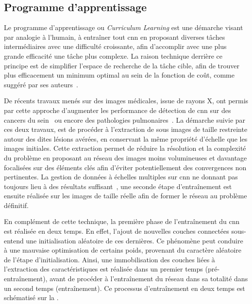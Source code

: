 \subsection{Programme d'apprentissage}
Le programme d'apprentissage ou \textit{Curriculum Learning} est une démarche visant par analogie à l'humain, à entraîner tout \gls{cnn} en proposant diverses tâches intermédiaires avec une difficulté croissante, afin d'accomplir avec une plus grande efficacité une tâche plus complexe. La raison technique derrière ce principe est de simplifier l'espace de recherche de la tâche cible, afin de trouver plus efficacement un minimum optimal au sein de la fonction de coût, comme suggéré par ses auteurs~\cite{Bengio2009}.\par

De récents travaux menés sur des images médicales, issue de rayons X, ont permis par cette approche d'augmenter les performance de détection de \gls{cnn} sur des cancers du sein~\cite{Lotter2017} ou encore des pathologies pulmonaires~\cite{Park2019}. La démarche suivie par ces deux travaux, est de procéder à l'extraction de sous images de taille restreinte autour des dites lésions avérées, en conservant la même propriété d'échelle que les images initiales. Cette extraction permet de réduire la résolution et la complexité du problème en proposant au réseau des images moins volumineuses et davantage focalisées sur des éléments clés afin d'éviter potentiellement des convergences non pertinentes. La gestion de données à échelles multiples sur \gls{cnn} ne donnant pas toujours lieu à des résultats suffisant~\cite{VanNoord2017}, une seconde étape d'entraînement est ensuite réalisée sur les images de taille réelle afin de former le réseau au problème définitif.\par

En complément de cette technique, la première phase de l'entraînement du \gls{cnn} est réalisée en deux temps. En effet, l'ajout de nouvelles couches connectées sous-entend une initialisation aléatoire de ces dernières. Ce phénomène peut conduire à une mauvaise optimisation de certains poids, provenant du caractère aléatoire de l'étape d'initialisation. Ainsi, une immobilisation des couches liées à l'extraction des caractéristiques est réalisée dans un premier temps (pré-entraînement), avant de procéder à l'entraînement du réseau dans sa totalité dans un second temps (entraînement). Ce processus d'entraînement en deux temps est schématisé sur la .\par

